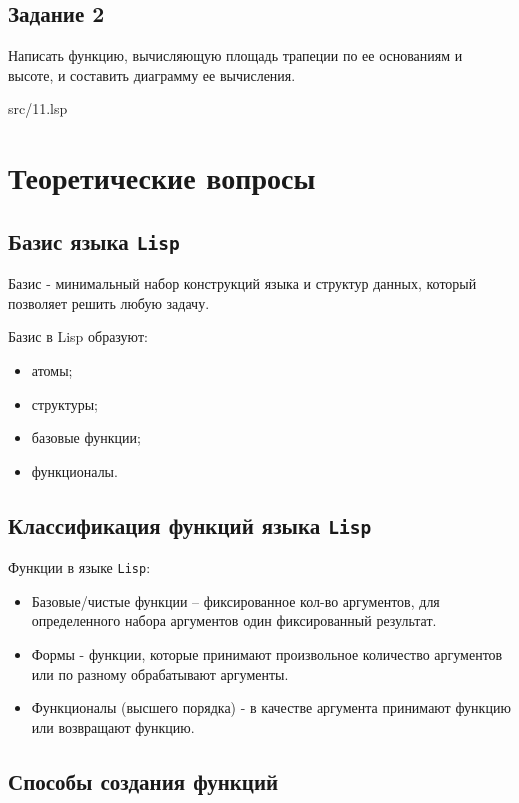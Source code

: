 \section*{Задание 2}
Написать функцию, вычисляющую площадь трапеции по ее основаниям и
высоте, и составить диаграмму ее вычисления.

\FloatBarrier
\begin{lstinputlisting}[style={lsp}]{src/11.lsp}
\end{lstinputlisting}
\FloatBarrier


\chapter*{Теоретические вопросы}

\section*{Базис языка \texttt{Lisp}}
Базис - минимальный набор конструкций языка и структур данных, который позволяет решить любую задачу.

Базис в Lisp образуют:
\begin{itemize}
	\item атомы;
	\item структуры;
	\item базовые функции;
	\item функционалы.
\end{itemize}

\section*{Классификация функций языка {\texttt{Lisp}}}

Функции в языке {\texttt{Lisp}}:
\begin{itemize}
	\item Базовые/чистые функции -- фиксированное кол-во аргументов, для определенного набора аргументов один фиксированный результат.
	\item Формы - функции, которые принимают произвольное количество аргументов или по разному обрабатывают аргументы.
	\item Функционалы (высшего порядка) - в качестве аргумента принимают функцию или возвращают функцию.
\end{itemize}

\section*{Способы создания функций}

